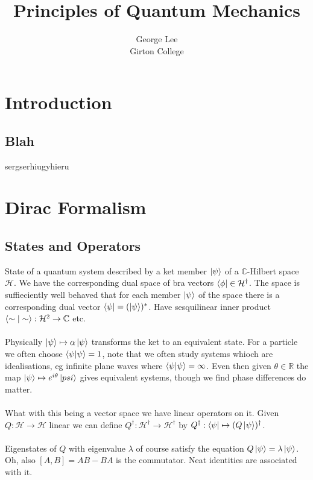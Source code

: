 \documentclass{article}
\title{Principles of Quantum Mechanics}
\author{George Lee\\Girton College}
\begin{document}
\maketitle
\section{Introduction}
\subsection{Blah}
sergserhiugyhieru
\section{Dirac Formalism}
\subsection{States and Operators}
State of a quantum system described by a ket member $\ket{\psi}$ of a $\mathbb{C}$-Hilbert space $\mathcal{H}$.  We have the corresponding dual space of bra vectors $\bra{\phi}\in\mathcal{H}^\dagger$.  The space is suffieciently well behaved that for each member $\ket{\psi}$ of the space there is a corresponding dual vector $\bra{\psi}=(\ket{\psi})^*$.  Have sesquilinear inner product $\braket{\sim|\sim}:\mathcal{H}^2\rightarrow\mathbb{C}$ etc.
\\
\\
Physically $\ket{\psi}\mapsto\alpha\ket{\psi}$ transforms the ket to an equivalent state.  For a particle we often choose $\braket{\psi|\psi}=1$, note that we often study systems whioch are idealisations, eg infinite plane waves where $\braket{\psi|\psi}=\infty$.  Even then given $\theta\in\mathbb{R}$ the map $\ket{\psi}\mapsto e^{i\theta}\ket{psi}$ gives equivalent systems, though we find phase differences do matter.
\\
\\
What with this being a vector space we have linear operators on it.  Given $Q:\mathcal{H}\rightarrow\mathcal{H}$ linear we can define $Q^\dagger:\mathcal{H}^\dagger\rightarrow\mathcal{H}^\dagger$ by $Q^\dagger:\bra{\psi}\mapsto(Q\ket{\psi})^\dagger$.
\\
\\
Eigenstates of $Q$ with eigenvalue $\lambda$ of course satisfy the equation $Q\ket{\psi}=\lambda\ket{\psi}$.  Oh, also $[A,B]=AB-BA$ is the commutator.  Neat identities are associated with it.
\end{document}
